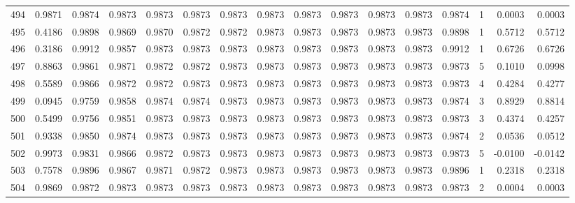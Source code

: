 \begin{tabular}{lrrrrrrrrrrrrrrr}
494 &      0.9871 &  0.9874 &  0.9873 &  0.9873 &  0.9873 &  0.9873 &  0.9873 &  0.9873 &  0.9873 &  0.9873 &   0.9873 &     0.9874 &      1 &                    0.0003 &                     0.0003 \\
495 &      0.4186 &  0.9898 &  0.9869 &  0.9870 &  0.9872 &  0.9872 &  0.9873 &  0.9873 &  0.9873 &  0.9873 &   0.9873 &     0.9898 &      1 &                    0.5712 &                     0.5712 \\
496 &      0.3186 &  0.9912 &  0.9857 &  0.9873 &  0.9873 &  0.9873 &  0.9873 &  0.9873 &  0.9873 &  0.9873 &   0.9873 &     0.9912 &      1 &                    0.6726 &                     0.6726 \\
497 &      0.8863 &  0.9861 &  0.9871 &  0.9872 &  0.9872 &  0.9873 &  0.9873 &  0.9873 &  0.9873 &  0.9873 &   0.9873 &     0.9873 &      5 &                    0.1010 &                     0.0998 \\
498 &      0.5589 &  0.9866 &  0.9872 &  0.9872 &  0.9873 &  0.9873 &  0.9873 &  0.9873 &  0.9873 &  0.9873 &   0.9873 &     0.9873 &      4 &                    0.4284 &                     0.4277 \\
499 &      0.0945 &  0.9759 &  0.9858 &  0.9874 &  0.9874 &  0.9873 &  0.9873 &  0.9873 &  0.9873 &  0.9873 &   0.9873 &     0.9874 &      3 &                    0.8929 &                     0.8814 \\
500 &      0.5499 &  0.9756 &  0.9851 &  0.9873 &  0.9873 &  0.9873 &  0.9873 &  0.9873 &  0.9873 &  0.9873 &   0.9873 &     0.9873 &      3 &                    0.4374 &                     0.4257 \\
501 &      0.9338 &  0.9850 &  0.9874 &  0.9873 &  0.9873 &  0.9873 &  0.9873 &  0.9873 &  0.9873 &  0.9873 &   0.9873 &     0.9874 &      2 &                    0.0536 &                     0.0512 \\
502 &      0.9973 &  0.9831 &  0.9866 &  0.9872 &  0.9873 &  0.9873 &  0.9873 &  0.9873 &  0.9873 &  0.9873 &   0.9873 &     0.9873 &      5 &                   -0.0100 &                    -0.0142 \\
503 &      0.7578 &  0.9896 &  0.9867 &  0.9871 &  0.9872 &  0.9873 &  0.9873 &  0.9873 &  0.9873 &  0.9873 &   0.9873 &     0.9896 &      1 &                    0.2318 &                     0.2318 \\
504 &      0.9869 &  0.9872 &  0.9873 &  0.9873 &  0.9873 &  0.9873 &  0.9873 &  0.9873 &  0.9873 &  0.9873 &   0.9873 &     0.9873 &      2 &                    0.0004 &                     0.0003 \\

\end{tabular}
